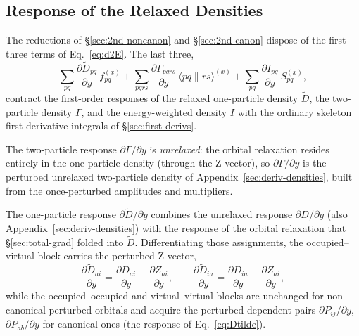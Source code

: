 \documentclass[12pt]{article}
\newcommand{\adb}[2]{\langle #1 \| #2 \rangle}
\begin{document}
\subsection{Response of the Relaxed Densities}
\label{sec:2nd-density-response}

The reductions of \S\ref{sec:2nd-noncanon} and \S\ref{sec:2nd-canon} dispose of
the first three terms of Eq.~\eqref{eq:d2E}.  The last three,
\begin{equation*}
\sum_{pq}\frac{\partial\tilde D_{pq}}{\partial y}\,f^{(x)}_{pq}
+ \sum_{pqrs}\frac{\partial\Gamma_{pqrs}}{\partial y}\,\adb{pq}{rs}^{(x)}
+ \sum_{pq}\frac{\partial I_{pq}}{\partial y}\,S^{(x)}_{pq},
\end{equation*}
contract the first-order responses of the relaxed one-particle density $\tilde
D$, the two-particle density $\Gamma$, and the energy-weighted density $I$ with
the ordinary skeleton first-derivative integrals of \S\ref{sec:first-derivs}.

The two-particle response $\partial\Gamma/\partial y$ is {\em unrelaxed}: the
orbital relaxation resides entirely in the one-particle density (through the
Z-vector), so $\partial\Gamma/\partial y$ is the perturbed unrelaxed
two-particle density of Appendix~\ref{sec:deriv-densities}, built from the
once-perturbed amplitudes and multipliers.

The one-particle response $\partial\tilde D/\partial y$ combines the unrelaxed
response $\partial D/\partial y$ (also Appendix~\ref{sec:deriv-densities}) with
the response of the orbital relaxation that \S\ref{sec:total-grad} folded into
$\tilde D$.  Differentiating those assignments, the occupied--virtual block
carries the perturbed Z-vector,
\begin{equation}
\frac{\partial\tilde D_{ai}}{\partial y} = \frac{\partial D_{ai}}{\partial y} - \frac{\partial Z_{ai}}{\partial y},
\qquad
\frac{\partial\tilde D_{ia}}{\partial y} = \frac{\partial D_{ia}}{\partial y} - \frac{\partial Z_{ai}}{\partial y},
\label{eq:dDtilde-ov}
\end{equation}
while the occupied--occupied and virtual--virtual blocks are unchanged for
non-canonical perturbed orbitals and acquire the perturbed dependent pairs
$\partial P_{ij}/\partial y$, $\partial P_{ab}/\partial y$ for canonical ones
(the response of Eq.~\eqref{eq:Dtilde}).
\end{document}
